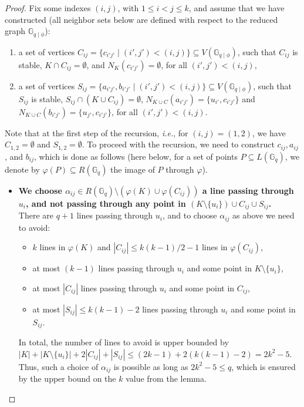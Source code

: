 \documentclass[10pt,a4paper]{article}
\newcommand{\ls}{\leqslant}
\newcommand{\G}[1][q]{\mathbb{G}_{#1}}
\newcommand{\Gphi}[1][q]{\mathbb{G}_{#1\mid\phi}}
\begin{document}
\begin{proof}
    \medskip\noindent Fix some indexes $(i,j)$, with $1\ls i < j \ls k$, and assume that we have constructed (all neighbor sets below are defined with respect to the reduced graph $\Gphi$):
    \begin{enumerate}
        \item a set of vertices $C_{ij} = \{c_{i' j'} \mid (i',j') < (i, j)  \} \subseteq V(\Gphi)$, such that $C_{ij}$ is stable,  $K\cap C_{ij} = \emptyset$, and $N_K(c_{i'j'}) = \emptyset$, for all $(i',j') < (i, j)$,
        \item a set of vertices  $S_{ij} = \{a_{i'j'},b_{i'j'} \mid (i',j') < (i, j) \} \subseteq V(\Gphi)$, 
              such that $S_{ij}$ is stable,  $S_{ij}\cap (K \cup C_{ij}) = \emptyset$,  $N_{K \cup C}(a_{i'j'}) = \{u_{i'}, c_{i'j'}\}$ and $N_{K \cup C}(b_{i'j'}) = \{u_{j'}, c_{i'j'}\}$, for all $(i',j') < (i, j)$.
    \end{enumerate}
    Note that at the first step of the recursion, \emph{i.e.}, for $(i,j) = (1,2)$, we have $C_{1,2} = \emptyset$ and $S_{1,2} = \emptyset$. To proceed with the recursion, we need to construct $c_{ij}, a_{ij}$, and $b_{ij}$, which is done as follows (here below, for a set of points $P\subseteq L(\G)$, we denote by $\varphi(P) \subseteq R(\G)$ the image of $P$ through $\varphi$).
    \begin{itemize}
        \item \textbf{We choose $\alpha_{ij}\in R(\G) \setminus (\varphi(K) \cup \varphi(C_{ij}))$ a line passing through $u_i$,  and not passing through any point in $(K \setminus \{u_i\}) \cup C_{ij} \cup S_{ij}$.} \\
        There are $q+1$ lines passing through $u_i$, and to choose $\alpha_{ij}$ as above we need to avoid:
        \begin{itemize}
            \item $k$ lines in $\varphi(K)$ and $|C_{ij}| \ls k(k-1)/2-1$ lines in $\varphi(C_{ij})$,
            \item at most $(k-1)$ lines passing through $u_i$ and some point in $K \setminus \{u_i\}$,
            \item at most $|C_{ij}|$ lines passing through $u_i$ and some point in $C_{ij}$,
            \item at most $|S_{ij}| \ls k(k-1)-2$ lines passing through $u_i$ and some point in $S_{ij}$.
        \end{itemize}
        In total, the number of lines to avoid is upper bounded by $|K| + |K \setminus \{u_i\}| + 2|C_{ij}| + |S_{ij}| \ls (2k-1) + 2(k(k-1)-2) = 2k^2 -5$. Thus, such a  choice of $\alpha_{ij}$ is possible as long as $2k^2 -5 \ls q$, which is ensured by the upper bound on the $k$ value from the lemma.


\end{itemize}
\end{proof}
\end{document}
